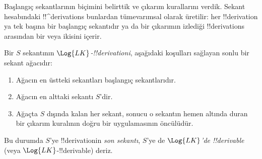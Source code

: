 

      {}
      {}


\begin{explain}
Başlangıç sekantlarının biçimini belirttik ve çıkarım kurallarını verdik.
Sekant hesabındaki !!^{derivation}s bunlardan tümevarımsal olarak üretilir:
her !!{derivation} ya tek başına bir başlangıç sekantıdır ya da bir çıkarımın
izlediği !!{derivation}s arasından bir veya ikisini içerir.
\end{explain}

\begin{defn}
Bir $S$ sekantının \emph{$\Log{LK}$-!!{derivation}{}i}, aşağıdaki koşulları
sağlayan sonlu bir sekant ağacıdır:
\begin{enumerate}
\item Ağacın en üstteki sekantları başlangıç sekantlarıdır.
\item Ağacın en alttaki sekantı $S$'dir.
\item Ağaçta $S$ dışında kalan her sekant, sonucu o sekantın hemen altında
  duran bir çıkarım kuralının doğru bir uygulamasının öncülüdür.
\end{enumerate}
Bu durumda $S$'ye !!{derivation}{}in \emph{son sekantı}, $S$'ye de
\emph{$\Log{LK}$'de !!{derivable}} (veya $\Log{LK}$-!!{derivable}) deriz.
\end{defn}

